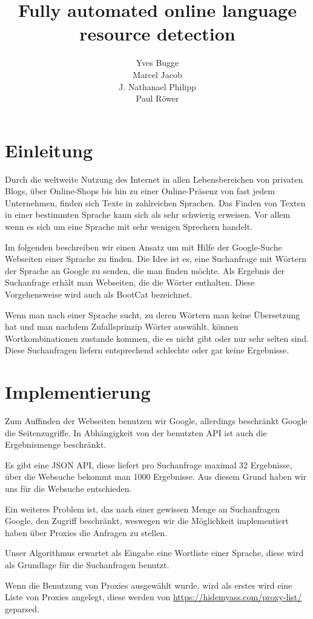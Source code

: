 \documentclass[a4paper, 12pt]{article}
\author{Yves Bugge\\Marcel Jacob\\J. Nathanael Philipp\\Paul Röwer}
\title{Fully automated online language resource detection}
\date{}
\begin{document}
\maketitle\newpage
\section{Einleitung}
Durch die weltweite Nutzung des Internet in allen Lebensbereichen von privaten Blogs, über Online-Shops bis hin zu einer Online-Präsenz von fast jedem Unternehmen, finden sich Texte in zahlreichen Sprachen. Das Finden von Texten in einer bestimmten Sprache kann sich als sehr schwierig erweisen. Vor allem wenn es sich um eine Sprache mit sehr wenigen Sprechern handelt.

Im folgenden beschreiben wir einen Ansatz um mit Hilfe der Google-Suche Webseiten einer Sprache zu finden. Die Idee ist es, eine Suchanfrage mit Wörtern der Sprache an Google zu senden, die man finden möchte. Als Ergebnis der Suchanfrage erhält man Webseiten, die die Wörter enthalten. Diese Vorgehensweise wird auch als BootCat bezeichnet.

Wenn man nach einer Sprache sucht, zu deren Wörtern man keine Übersetzung hat und man nachdem Zufallsprinzip Wörter auswählt, können Wortkombinationen zustande kommen, die es nicht gibt oder nur sehr selten sind. Diese Suchanfragen liefern entsprechend schlechte oder gar keine Ergebnisse.

\section{Implementierung}
Zum Auffinden der Webseiten benutzen wir Google, allerdings beschränkt Google die Seitenzugriffe. In Abhängigkeit von der benutzten API ist auch die Ergebnismenge beschränkt.

Es gibt eine JSON API, diese liefert pro Suchanfrage maximal 32 Ergebnisse, über die Websuche bekommt man 1000 Ergebnisse. Aus diesem Grund haben wir uns für die Websuche entschieden.

Ein weiteres Problem ist, das nach einer gewissen Menge an Suchanfragen Google, den Zugriff beschränkt, weswegen wir die Möglichkeit implementiert haben über Proxies die Anfragen zu stellen.

Unser Algorithmus erwartet als Eingabe eine Wortliste einer Sprache, diese wird als Grundlage für die Suchanfragen benutzt.

Wenn die Benutzung von Proxies ausgewählt wurde, wird als erstes wird eine Liste von Proxies angelegt, diese werden von \url{https://hidemyass.com/proxy-list/} geparsed.
\end{document}
